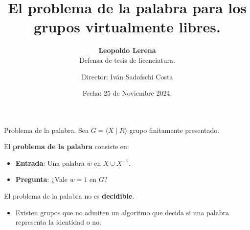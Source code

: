 \documentclass[aspectratio=169, 10pt]{beamer}
\title{El problema de la palabra para los grupos virtualmente libres.}
\subtitle{\textbf{Leopoldo Lerena} \\
		Defensa de tesis de licenciatura.}
\date{Fecha: 25 de Noviembre 2024.}
\author{Director: Iván Sadofschi Costa}
\institute{Universidad de Buenos Aires}
\begin{document}
	\maketitle

	
	
	
	\begin{frame}[fragile]{Problema de la palabra.}
		Sea $ G = \langle X \mid R \rangle$ grupo finitamente presentado.
		
		\pause 

		El \textbf{problema de la palabra} consiste en:
		\pause 
		\begin{itemize}
					\item 
						\textbf{Entrada}: Una palabra $w$ en $X \cup X^{-1}$.
					\pause 
					\item 
						\textbf{Pregunta}: ¿Vale $w=1$ en $G$?
		\end{itemize}
		\pause 

		El problema de la palabra no es \textbf{decidible}. 
		\pause 
		\begin{itemize}
			\item 
				Existen grupos que no admiten un algoritmo que decida si una palabra representa la identidad o no.
		\end{itemize}
		
		
	\end{frame}
\end{document}
